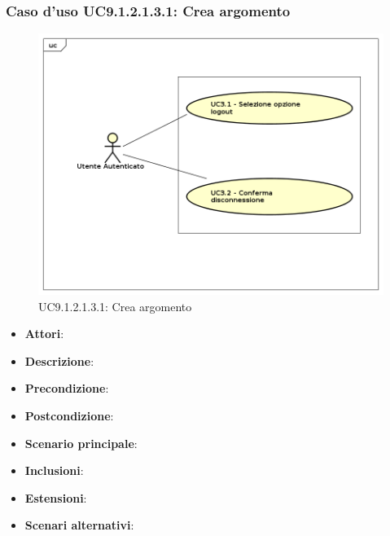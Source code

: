 						\subsubsection{Caso d'uso UC9.1.2.1.3.1: Crea argomento}
						\label{UC9.1.2.1.3.1}
						\begin{figure}[h]
							\centering
						\includegraphics[scale=0.7,keepaspectratio]{UML/UC9.png}
							\caption{UC9.1.2.1.3.1: Crea argomento}
						\end{figure}
						\FloatBarrier
						\begin{itemize}
							\item \textbf{Attori}: 
							\item \textbf{Descrizione}: 
							\item \textbf{Precondizione}: 
							\item \textbf{Postcondizione}: 
							\item \textbf{Scenario principale}:
							\item \textbf{Inclusioni}:
							\item \textbf{Estensioni}:
							\item \textbf{Scenari alternativi}:
						\end{itemize}
						
